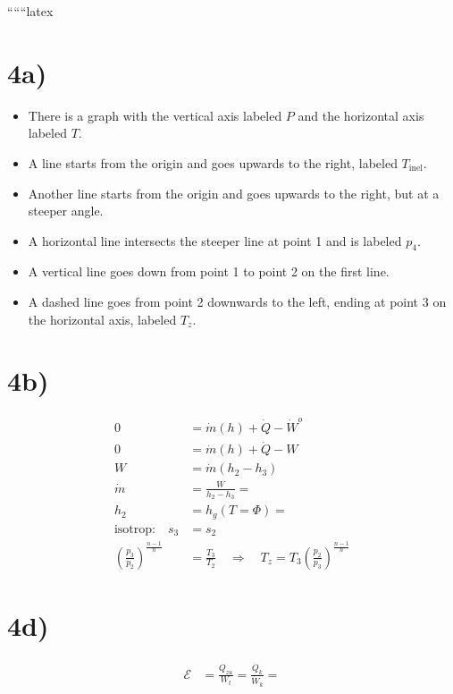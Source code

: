
``````latex


\section*{4a)}

\begin{itemize}
    \item There is a graph with the vertical axis labeled \( P \) and the horizontal axis labeled \( T \).
    \item A line starts from the origin and goes upwards to the right, labeled \( T_{\text{inel}} \).
    \item Another line starts from the origin and goes upwards to the right, but at a steeper angle.
    \item A horizontal line intersects the steeper line at point 1 and is labeled \( p_4 \).
    \item A vertical line goes down from point 1 to point 2 on the first line.
    \item A dashed line goes from point 2 downwards to the left, ending at point 3 on the horizontal axis, labeled \( T_z \).
\end{itemize}

\section*{4b)}

\begin{align*}
0 &= \dot{m}(h) + \dot{Q} - \dot{W}^o \\
0 &= \dot{m}(h) + \dot{Q} - W \\
W &= \dot{m}(h_2 - h_3) \\
\dot{m} &= \frac{W}{h_2 - h_3} = \\
h_2 &= h_g(T = \Phi) = \\
\text{isotrop:} \quad s_3 &= s_2 \\
\left( \frac{p_3}{p_2} \right)^{\frac{n-1}{n}} &= \frac{T_3}{T_2} \quad \Rightarrow \quad T_z = T_3 \left( \frac{p_2}{p_3} \right)^{\frac{n-1}{n}}
\end{align*}

\section*{4d)}

\begin{align*}
\mathcal{E} &= \frac{Q_{zu}}{W_t} = \frac{\dot{Q}_k}{\dot{W}_k} =
\end{align*}

